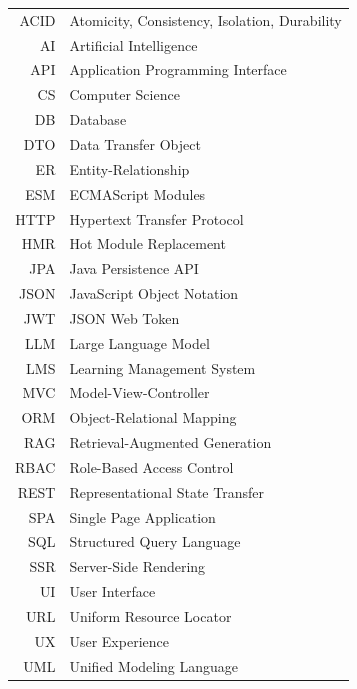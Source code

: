 \documentclass[english,bachelor,unicode,oneside]{ctufit-thesis}
\begin{document}
\begin{tabular}{rl}
	ACID  & Atomicity, Consistency, Isolation, Durability  \\
	AI    & Artificial Intelligence                        \\
	API   & Application Programming Interface              \\
	CS    & Computer Science                               \\
	DB    & Database                                       \\
	DTO   & Data Transfer Object                           \\
	ER    & Entity-Relationship                            \\
	ESM   & ECMAScript Modules                             \\
	HTTP  & Hypertext Transfer Protocol                    \\
	HMR   & Hot Module Replacement                         \\
	JPA   & Java Persistence API                           \\
	JSON  & JavaScript Object Notation                     \\
	JWT   & JSON Web Token                                 \\
	LLM   & Large Language Model                           \\
	LMS   & Learning Management System                     \\
	MVC   & Model-View-Controller                          \\
	ORM   & Object-Relational Mapping                      \\
	RAG   & Retrieval-Augmented Generation                 \\
	RBAC  & Role-Based Access Control                      \\
	REST  & Representational State Transfer                \\
	SPA   & Single Page Application                        \\
	SQL   & Structured Query Language                      \\
	SSR   & Server-Side Rendering                          \\
	UI    & User Interface                                 \\
	URL   & Uniform Resource Locator                       \\
	UX    & User Experience                                \\
	UML   & Unified Modeling Language                      \\
\end{tabular}
\resumeTOCentries
\mainmatter\mainmatterinit %
\end{document}
